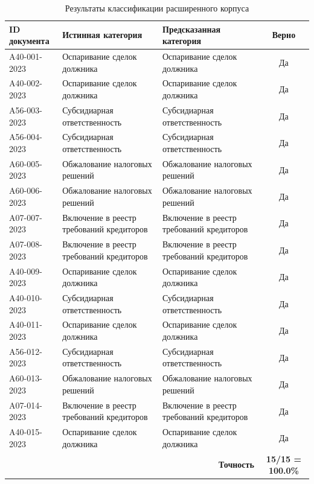 \documentclass[12pt, a4paper]{report}
\begin{document}
\begin{table}[h]
  \centering
  \caption{Результаты классификации расширенного корпуса}
  \label{tab:classification_extended}
  \begin{tabularx}{\textwidth}{l X X c}
    \toprule
    \rowcolor{LightBlue}
    \textsf{\textbf{ID документа}} &
    \textsf{\textbf{Истинная категория}} &
    \textsf{\textbf{Предсказанная категория}} &
    \textsf{\textbf{Верно}} \\
    \midrule
    A40-001-2023 & Оспаривание сделок должника & Оспаривание сделок должника & Да \\
    A40-002-2023 & Оспаривание сделок должника & Оспаривание сделок должника & Да \\
    A56-003-2023 & Субсидиарная ответственность & Субсидиарная ответственность & Да \\
    A56-004-2023 & Субсидиарная ответственность & Субсидиарная ответственность & Да \\
    A60-005-2023 & Обжалование налоговых решений & Обжалование налоговых решений & Да \\
    A60-006-2023 & Обжалование налоговых решений & Обжалование налоговых решений & Да \\
    A07-007-2023 & Включение в реестр требований кредиторов & Включение в реестр требований кредиторов & Да \\
    A07-008-2023 & Включение в реестр требований кредиторов & Включение в реестр требований кредиторов & Да \\
    A40-009-2023 & Оспаривание сделок должника & Оспаривание сделок должника & Да \\
    A40-010-2023 & Субсидиарная ответственность & Субсидиарная ответственность & Да \\
    A40-011-2023 & Оспаривание сделок должника & Оспаривание сделок должника & Да \\
    A56-012-2023 & Субсидиарная ответственность & Субсидиарная ответственность & Да \\
    A60-013-2023 & Обжалование налоговых решений & Обжалование налоговых решений & Да \\
    A07-014-2023 & Включение в реестр требований кредиторов & Включение в реестр требований кредиторов & Да \\
    A40-015-2023 & Оспаривание сделок должника & Оспаривание сделок должника & Да \\
    \midrule
    \multicolumn{3}{r}{\textsf{\textbf{Точность}}} & \textbf{15/15 = 100.0\%} \\
    \bottomrule
  \end{tabularx}
\end{table}
\end{document}
